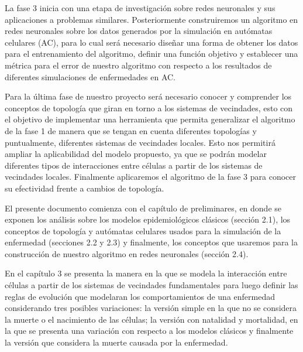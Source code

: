 La fase 3 inicia con una etapa de investigación sobre redes neuronales y sus aplicaciones a problemas similares. Posteriormente construiremos un algoritmo en redes neuronales sobre los datos generados por la simulación en autómatas celulares (AC), para lo cual será necesario diseñar una forma de obtener los datos para el entrenamiento del algoritmo, definir una función objetivo y establecer una métrica para el error de nuestro algoritmo con respecto a los resultados de diferentes simulaciones de enfermedades en AC.

Para la última fase de nuestro proyecto será necesario conocer y comprender los conceptos de topología que giran en torno a los sistemas de vecindades, esto con el objetivo de implementar una herramienta que permita generalizar el algoritmo de la fase 1 de manera que se tengan en cuenta diferentes topologías y puntualmente, diferentes sistemas de vecindades locales. Esto nos permitirá ampliar la aplicabilidad del modelo propuesto, ya que se podrán modelar diferentes tipos de interacciones entre células a partir de los sistemas de vecindades locales. Finalmente aplicaremos el algoritmo de la fase 3 para conocer su efectividad frente a cambios de topología.

El presente documento comienza con el capítulo de preliminares, en donde se exponen los análisis sobre los modelos epidemiológicos clásicos (sección 2.1), los conceptos de topología y autómatas celulares usados para la simulación de la enfermedad (secciones 2.2 y 2.3) y finalmente, los conceptos que usaremos para la construcción de nuestro algoritmo en redes neuronales (sección 2.4).

En el capítulo 3 se presenta la manera en la que se modela la interacción entre células a partir de los sistemas de vecindades fundamentales para luego definir las reglas de evolución que modelaran los comportamientos de una enfermedad considerando tres posibles variaciones: la versión simple en la que no se considera la muerte o el nacimiento de las células; la versión con natalidad y mortalidad, en la que se presenta una variación con respecto a los modelos clásicos y finalmente la versión que considera la muerte causada por la enfermedad.

